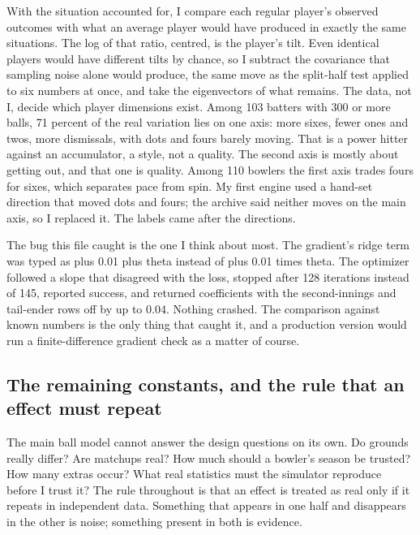 \documentclass[11pt,letterpaper]{article}
\begin{document}
With the situation accounted for, I compare each regular player's observed outcomes with what an average player would have produced in exactly the same situations. The log of that ratio, centred, is the player's tilt. Even identical players would have different tilts by chance, so I subtract the covariance that sampling noise alone would produce, the same move as the split-half test applied to six numbers at once, and take the eigenvectors of what remains. The data, not I, decide which player dimensions exist. Among 103 batters with 300 or more balls, 71 percent of the real variation lies on one axis: more sixes, fewer ones and twos, more dismissals, with dots and fours barely moving. That is a power hitter against an accumulator, a style, not a quality. The second axis is mostly about getting out, and that one is quality. Among 110 bowlers the first axis trades fours for sixes, which separates pace from spin. My first engine used a hand-set direction that moved dots and fours; the archive said neither moves on the main axis, so I replaced it. The labels came after the directions.


The bug this file caught is the one I think about most. The gradient's ridge term was typed as plus 0.01 plus theta instead of plus 0.01 times theta. The optimizer followed a slope that disagreed with the loss, stopped after 128 iterations instead of 145, reported success, and returned coefficients with the second-innings and tail-ender rows off by up to 0.04. Nothing crashed. The comparison against known numbers is the only thing that caught it, and a production version would run a finite-difference gradient check as a matter of course.


\subsection{The remaining constants, and the rule that an effect must repeat}

The main ball model cannot answer the design questions on its own. Do grounds really differ? Are matchups real? How much should a bowler's season be trusted? How many extras occur? What real statistics must the simulator reproduce before I trust it? The rule throughout is that an effect is treated as real only if it repeats in independent data. Something that appears in one half and disappears in the other is noise; something present in both is evidence.
\end{document}
